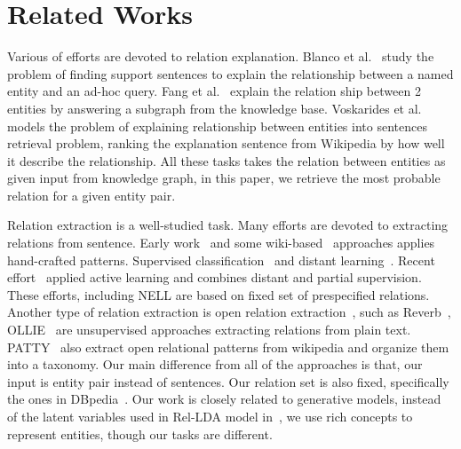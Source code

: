 \section{Related Works}
\label{sec:rel}

Various of efforts are devoted to relation explanation.
Blanco et al.~\cite{blanco2010finding} study the problem of finding support sentences to explain the relationship between a named entity and an ad-hoc query.
Fang et al.~\cite{fang2011rex} explain the relation ship between 2 entities by answering a subgraph from the knowledge base.
Voskarides et al.~\cite{voskarideslearning} models the problem of explaining relationship between entities into sentences retrieval problem, ranking the explanation sentence from Wikipedia by how well it describe the relationship.
All these tasks takes the relation between entities as given input from knowledge graph, in this paper, we retrieve the most probable relation for a given entity pair.

Relation extraction is a well-studied task.
Many efforts are devoted to extracting relations from sentence.
Early work~\cite{hearst1992automatic,brin1999extracting,agichtein2000snowball} and some wiki-based~\cite{ponzetto2008wikitaxonomy} approaches applies hand-crafted patterns.
Supervised classification~\cite{doddington2004automatic,guodong2005exploring} and distant learning~\cite{craven1999constructing,wu2007autonomously,bunescu2007learning,mintz2009distant}.
Recent effort~\cite{angeli2014combining} applied active learning and combines distant and partial supervision.
These efforts, including NELL are based on  fixed set of prespecified relations.
Another type of relation extraction is open relation extraction~\cite{banko2007open}, such as Reverb~\cite{fader2011identifying}, OLLIE~\cite{schmitz2012open} are unsupervised approaches extracting relations from plain text.
PATTY~\cite{nakashole2012patty} also extract open relational patterns from wikipedia and organize them into a taxonomy.
Our main difference from all of the approaches is that, our input is entity pair instead of sentences.
Our relation set is also fixed, specifically the ones in DBpedia~\cite{auer2007dbpedia}.
Our work is closely related to generative models, instead of the latent variables used in Rel-LDA model in~\cite{yao2011structured}, we use rich concepts to represent entities, though our tasks are different.



